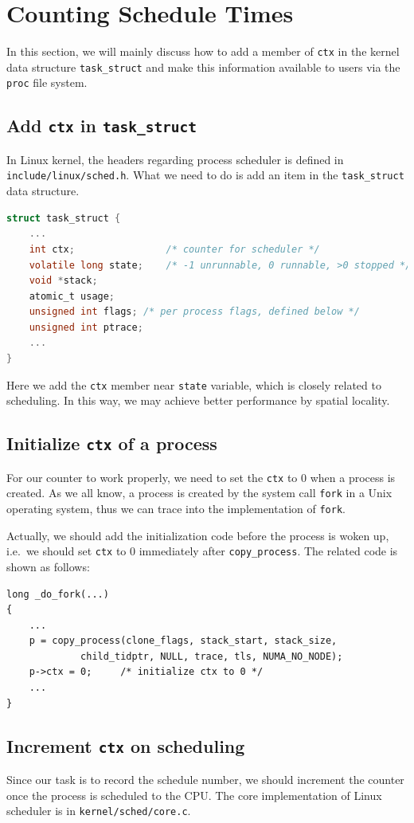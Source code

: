 \documentclass{article}
\begin{document}
\section{Counting Schedule Times}
In this section, we will mainly discuss how to add a member of {\tt ctx} in the kernel data structure {\tt task\_struct} and make this information available to users via the {\tt proc} file system.
\subsection{Add {\tt ctx} in {\tt task\_struct}}
In Linux kernel, the headers regarding process scheduler is defined in {\tt include/linux/sched.h}. What we need to do is add an item in the {\tt task\_struct} data structure.

\begin{lstlisting}[language=c, caption=add ctx to task\_struct]
struct task_struct {
	...
	int ctx;				/* counter for scheduler */
	volatile long state;	/* -1 unrunnable, 0 runnable, >0 stopped */
	void *stack;
	atomic_t usage;
	unsigned int flags;	/* per process flags, defined below */
	unsigned int ptrace;
	...
}
\end{lstlisting}
Here we add the {\tt ctx} member near {\tt state} variable, which is closely related to scheduling. In this way, we may achieve better performance by spatial locality.

\subsection{Initialize {\tt ctx} of a process}
For our counter to work properly, we need to set the {\tt ctx} to 0 when a process is created. As we all know, a process is created by the system call {\tt fork} in a Unix operating system, thus we can trace into the implementation of {\tt fork}.

Actually, we should add the initialization code before the process is woken up, i.e.\ we should set {\tt ctx} to 0 immediately after {\tt copy\_process}. The related code is shown as follows:
\begin{lstlisting}[caption=Initialize ctx to 0]
long _do_fork(...)
{
	...
	p = copy_process(clone_flags, stack_start, stack_size,
			 child_tidptr, NULL, trace, tls, NUMA_NO_NODE);
	p->ctx = 0;		/* initialize ctx to 0 */
	...
}
\end{lstlisting}

\subsection{Increment {\tt ctx} on scheduling}
Since our task is to record the schedule number, we should increment the counter once the process is scheduled to the CPU. The core implementation of Linux scheduler is in {\tt kernel/sched/core.c}.
\end{document}
